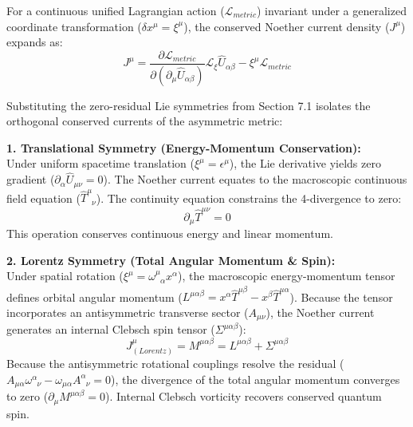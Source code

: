 For a continuous unified Lagrangian action ($\mathcal{L}_{metric}$) invariant under a generalized coordinate transformation ($\delta x^\mu = \xi^\mu$), the conserved Noether current density ($J^\mu$) expands as:
\begin{equation}
    J^\mu = \frac{\partial \mathcal{L}_{metric}}{\partial (\partial_\mu \hat{U}_{\alpha\beta})} \mathcal{L}_\xi \hat{U}_{\alpha\beta} - \xi^\mu \mathcal{L}_{metric}
\end{equation}

Substituting the zero-residual Lie symmetries from Section 7.1 isolates the orthogonal conserved currents of the asymmetric metric:

\textbf{1. Translational Symmetry (Energy-Momentum Conservation):} \\
Under uniform spacetime translation ($\xi^\mu = \epsilon^\mu$), the Lie derivative yields zero gradient ($\partial_\alpha \hat{U}_{\mu\nu} = 0$). The Noether current equates to the macroscopic continuous field equation ($\hat{T}^{\mu}_{\phantom{\mu}\nu}$). The continuity equation constrains the 4-divergence to zero:
\begin{equation}
    \partial_\mu \hat{T}^{\mu\nu} = 0
\end{equation}
This operation conserves continuous energy and linear momentum.

\textbf{2. Lorentz Symmetry (Total Angular Momentum \& Spin):} \\
Under spatial rotation ($\xi^\mu = \omega^\mu_{\phantom{\mu}\alpha} x^\alpha$), the macroscopic energy-momentum tensor defines orbital angular momentum ($L^{\mu\alpha\beta} = x^\alpha \hat{T}^{\mu\beta} - x^\beta \hat{T}^{\mu\alpha}$). Because the tensor incorporates an antisymmetric transverse sector ($A_{\mu\nu}$), the Noether current generates an internal Clebsch spin tensor ($\Sigma^{\mu\alpha\beta}$):
\begin{equation}
    J^\mu_{(Lorentz)} = M^{\mu\alpha\beta} = L^{\mu\alpha\beta} + \Sigma^{\mu\alpha\beta}
\end{equation}
Because the antisymmetric rotational couplings resolve the residual ($A_{\mu\alpha}\omega^\alpha_{\phantom{\alpha}\nu} - \omega_{\mu\alpha}A^\alpha_{\phantom{\alpha}\nu} = 0$), the divergence of the total angular momentum converges to zero ($\partial_\mu M^{\mu\alpha\beta} = 0$). 
Internal Clebsch vorticity recovers conserved quantum spin.



